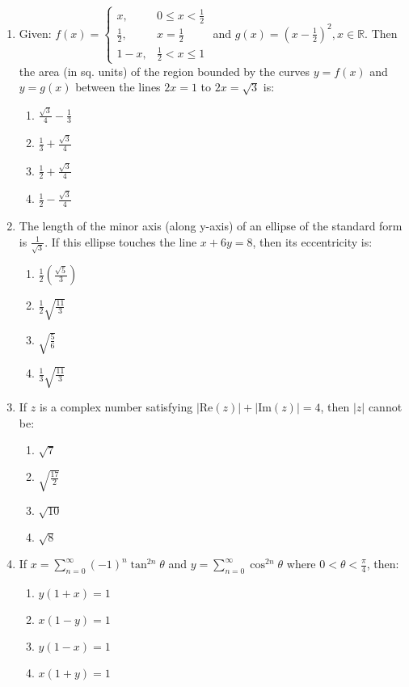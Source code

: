 \documentclass[journal]{IEEEtran}
\newcommand{\brak}[1]{\left( #1 \right)}
\newcommand{\abs}[1]{\left| #1 \right|}
\newcommand{\lt}{<}
\begin{document}
\begin{enumerate}
    \item Given:
    $ f(x) = 
    \begin{cases}
    x, & 0 \leq x < \frac{1}{2} \\
    \frac{1}{2}, & x = \frac{1}{2} \\
    1 - x, & \frac{1}{2} < x \leq 1
    \end{cases} $
    and $ g(x) = \brak{ x - \frac{1}{2} }^{2}, x \in \mathbb{R} $.
    Then the area (in sq. units) of the region bounded by the curves $ y = f(x) $ and $ y = g(x) $ between the lines $ 2x = 1 $ to $ 2x = \sqrt{3} $ is:
    \begin{enumerate}
        \item $ \frac{\sqrt{3}}{4} - \frac{1}{3} $
        \item $ \frac{1}{3} + \frac{\sqrt{3}}{4} $
        \item $ \frac{1}{2} + \frac{\sqrt{3}}{4} $
        \item $ \frac{1}{2} - \frac{\sqrt{3}}{4} $
    \end{enumerate}

    \item The length of the minor axis (along y-axis) of an ellipse of the standard form is $ \frac{1}{\sqrt{3}} $. If this ellipse touches the line $ x + 6y = 8 $, then its eccentricity is:
    \begin{enumerate}
        \item $ \frac{1}{2} \left( \frac{\sqrt{5}}{3} \right) $
        \item $ \frac{1}{2} \sqrt{\frac{11}{3}} $
        \item $ \sqrt{\frac{5}{6}} $
        \item $ \frac{1}{3} \sqrt{\frac{11}{3}} $
    \end{enumerate}

    \item If $ z $ is a complex number satisfying $ \abs{\text{Re}(z)} + \abs{\text{Im}(z)} = 4 $, then $ \abs{z} $ cannot be:
    \begin{enumerate}
        \item $ \sqrt{7} $
        \item $ \sqrt{\frac{17}{2}} $
        \item $ \sqrt{10} $
        \item $ \sqrt{8} $
    \end{enumerate}

    \item If        
    $ x = \sum_{n=0}^{\infty} (-1)^{n} \tan^{2n} \theta $  
    and
    $ y = \sum_{n=0}^{\infty} \cos^{2n} \theta $
    where $ 0 \lt \theta \lt \frac{\pi}{4} $, then:
    \begin{enumerate}
        \item $ y \brak{ 1 + x } = 1 $
        \item $ x \brak{ 1 - y } = 1 $
        \item $ y \brak{ 1 - x } = 1 $
        \item $ x \brak{ 1 + y } = 1 $
        
    \end{enumerate}

\end{enumerate}
\end{document}
